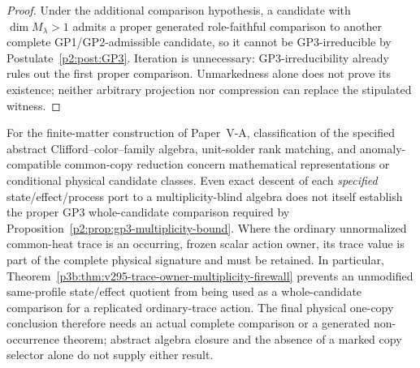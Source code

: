 \documentclass[11pt,a4paper]{article}
\begin{document}
\begin{proof}
Under the additional comparison hypothesis, a candidate with
\(\dim M_\lambda>1\) admits a proper generated role-faithful comparison
to another complete GP1/GP2-admissible candidate, so it cannot be
GP3-irreducible by Postulate~\ref{p2:post:GP3}.  Iteration is unnecessary:
GP3-irreducibility already rules out the first proper comparison.
Unmarkedness alone does not prove its existence; neither arbitrary
projection nor compression can replace the stipulated witness.
\end{proof}

\begin{remark}
\label{p2:rem:v329-matter-gp3-whole-owner}
For the finite-matter construction of Paper~V-A, classification of the
specified abstract Clifford--color--family algebra, unit-solder rank
matching, and anomaly-compatible common-copy reduction concern
mathematical representations or conditional physical candidate classes.
Even exact descent of each \emph{specified} state/effect/process port
to a multiplicity-blind algebra does not itself establish the proper
GP3 whole-candidate comparison required by
Proposition~\ref{p2:prop:gp3-multiplicity-bound}.
Where the ordinary unnormalized common-heat trace is an occurring,
frozen scalar action owner, its trace value is part of the complete
physical signature and must be retained. In particular,
Theorem~\ref{p3b:thm:v295-trace-owner-multiplicity-firewall}
prevents an unmodified same-profile state/effect quotient from being
used as a whole-candidate comparison for a replicated ordinary-trace
action. The final physical one-copy conclusion therefore needs an
actual complete comparison or a generated non-occurrence theorem;
abstract algebra closure and the absence of a marked copy selector
alone do not supply either result.
\end{remark}
\end{document}

